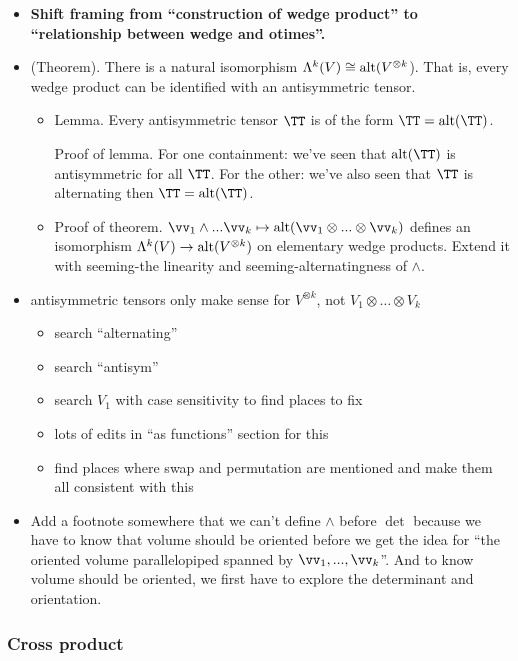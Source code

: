 \begin{itemize}
    \item \textbf{Shift framing from “construction of wedge product” to “relationship between wedge and otimes”.}
    \item (Theorem). There is a natural isomorphism $\Lambda^k(V) \cong \text{alt}(V^{\otimes k}$). That is, every wedge product can be identified with an antisymmetric tensor.
    \begin{itemize}
        \item Lemma. Every antisymmetric tensor $\TT$ is of the form $\TT = \alt(\TT)$.

        Proof of lemma. For one containment: we've seen that $\alt(\TT)$ is antisymmetric for all $\TT$. For the other: we've also seen that $\TT$ is alternating then $\TT = \alt(\TT)$.

        \item Proof of theorem. $\vv_1 \wedge ... \vv_k \mapsto \alt(\vv_1 \otimes ... \otimes \vv_k)$ defines an isomorphism $\Lambda^k(V) \rightarrow \text{alt}(V^{\otimes k})$ on elementary wedge products. Extend it with seeming-the linearity and seeming-alternatingness of $\wedge$. 
    \end{itemize}

    \item antisymmetric tensors only make sense for $V^{\otimes k}$, not $V_1 \otimes … \otimes V_k$
    \begin{itemize}
        \item search “alternating”
        \item search “antisym”
        \item search $V_1$ with case sensitivity to find places to fix
        \item lots of edits in “as functions” section for this
        \item find places where swap and permutation are mentioned and make them all consistent with this
    \end{itemize}
    \item Add a footnote somewhere that we can't define $\wedge$ before $\det$ because we have to know that volume should be oriented before we get the idea for ``the oriented volume parallelopiped spanned by $\vv_1, ..., \vv_k$''. And to know volume should be oriented, we first have to explore the determinant and orientation.
\end{itemize}

\subsubsection{Cross product}

